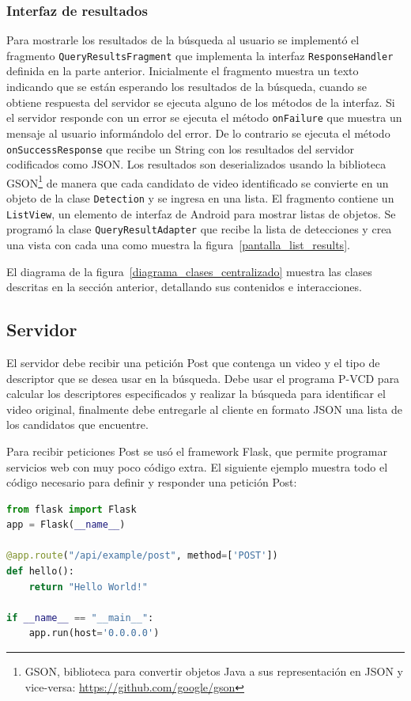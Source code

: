 \subsubsection*{Interfaz de resultados}
Para mostrarle los resultados de la búsqueda al usuario se implementó el fragmento \texttt{QueryResultsFragment} que implementa la interfaz \texttt{ResponseHandler} definida en la parte anterior. Inicialmente el fragmento muestra un texto indicando que se están esperando los resultados de la búsqueda, cuando se obtiene respuesta del servidor se ejecuta alguno de los métodos de la interfaz. Si el servidor responde con un error se ejecuta el método \texttt{onFailure} que muestra un mensaje al usuario informándolo del error. De lo contrario se ejecuta el método \texttt{onSuccessResponse} que recibe un String con los resultados del servidor codificados como JSON. Los resultados son deserializados usando la biblioteca GSON\footnote{GSON, biblioteca para convertir objetos Java a sus representación en JSON y vice-versa: \url{https://github.com/google/gson}} de manera que cada candidato de video identificado se convierte en un objeto de la clase \texttt{Detection} y se ingresa en una lista. El fragmento contiene un \texttt{ListView}, un elemento de interfaz de Android para mostrar listas de objetos. Se programó la clase \texttt{QueryResultAdapter} que recibe la lista de detecciones y crea una vista con cada una como muestra la figura~\ref{pantalla_list_results}.

El diagrama de la figura~\ref{diagrama_clases_centralizado} muestra las clases descritas en la sección anterior, detallando sus contenidos e interacciones.

\subsection{Servidor}

El servidor debe recibir una petición Post que contenga un video y el tipo de descriptor que se desea usar en la búsqueda. Debe usar el programa P-VCD para calcular los descriptores especificados y realizar la búsqueda para identificar el video original, finalmente debe entregarle al cliente en formato JSON una lista de los candidatos que encuentre.

Para recibir peticiones Post se usó el framework Flask, que permite programar servicios web con muy poco código extra. El siguiente ejemplo muestra todo el código necesario para definir y responder una petición Post:
\begin{lstlisting}[language=python]
from flask import Flask
app = Flask(__name__)

@app.route("/api/example/post", method=['POST'])
def hello():
	return "Hello World!"
	
if __name__ == "__main__":
	app.run(host='0.0.0.0')
\end{lstlisting}

